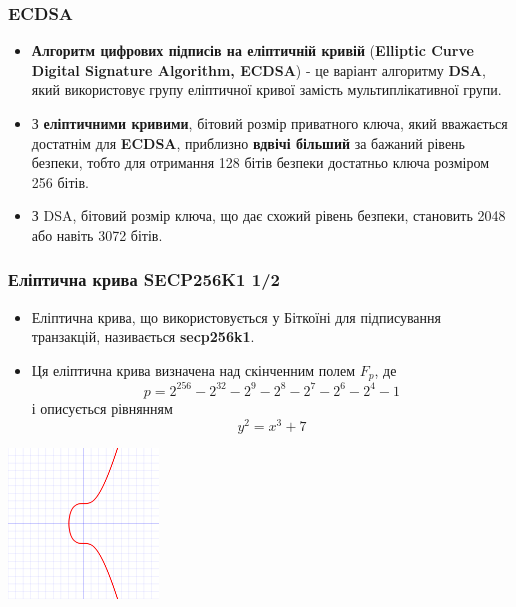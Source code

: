\documentclass{beamer}
\begin{document}
\begin{frame}
  \frametitle{ECDSA}
  \begin{itemize}  
  \item \textbf{Алгоритм цифрових підписів на еліптичній кривій}
    (\textbf{Elliptic Curve Digital Signature Algorithm, ECDSA}) -
    це варіант алгоритму \textbf{DSA}, який використовує групу еліптичної кривої
    замість мультиплікативної групи.
  \item З \textbf{еліптичними кривими}, бітовий розмір приватного ключа, який
    вважається достатнім для \textbf{ECDSA}, приблизно \textbf{вдвічі більший}
    за бажаний рівень безпеки, тобто для отримання 128 бітів безпеки достатньо
    ключа розміром 256 бітів.
  \item З DSA, бітовий розмір ключа, що дає схожий рівень безпеки, становить
    2048 або навіть 3072 бітів.
  \end{itemize}
\end{frame}

\begin{frame}
  \frametitle{Еліптична крива SECP256K1 1/2}
  \begin{itemize}
  \item Еліптична крива, що використовується у Біткоїні для підписування
    транзакцій, називається \textbf{secp256k1}.
  \item Ця еліптична крива визначена над скінченним полем $F_p$, де
    $$p = 2^{256} - 2^{32} - 2^9 - 2^8 - 2^7 - 2^6 - 2^4 - 1$$ і описується рівнянням
    $$y^2 = x^3 + 7$$
  \end{itemize}
  \begin{center}
    \includegraphics[width=0.3\textwidth]{secp256k1}
  \end{center}
\end{frame}
\end{document}
